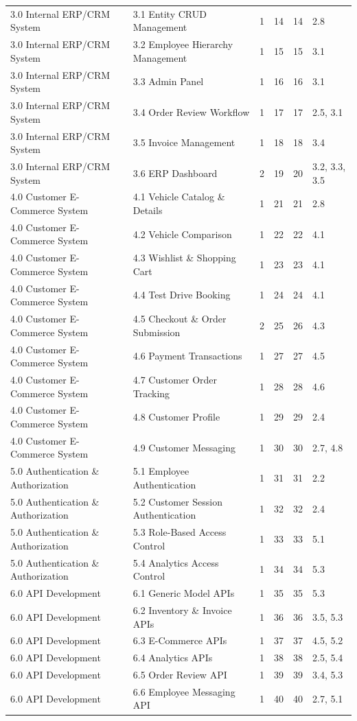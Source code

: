 \begin{longtable}{@{}p{3cm}p{5.5cm}rrrp{1.8cm}@{}}
3.0 Internal ERP/CRM System
& 3.1 Entity CRUD Management & 1 & 14 & 14 & 2.8 \\
3.0 Internal ERP/CRM System
& 3.2 Employee Hierarchy Management & 1 & 15 & 15 & 3.1 \\
3.0 Internal ERP/CRM System
& 3.3 Admin Panel & 1 & 16 & 16 & 3.1 \\
3.0 Internal ERP/CRM System
& 3.4 Order Review Workflow & 1 & 17 & 17 & 2.5, 3.1 \\
3.0 Internal ERP/CRM System
& 3.5 Invoice Management & 1 & 18 & 18 & 3.4 \\
3.0 Internal ERP/CRM System
& 3.6 ERP Dashboard & 2 & 19 & 20 & 3.2, 3.3, 3.5 \\

4.0 Customer E-Commerce System
& 4.1 Vehicle Catalog \& Details & 1 & 21 & 21 & 2.8 \\
4.0 Customer E-Commerce System
& 4.2 Vehicle Comparison & 1 & 22 & 22 & 4.1 \\
4.0 Customer E-Commerce System
& 4.3 Wishlist \& Shopping Cart & 1 & 23 & 23 & 4.1 \\
4.0 Customer E-Commerce System
& 4.4 Test Drive Booking & 1 & 24 & 24 & 4.1 \\
4.0 Customer E-Commerce System
& 4.5 Checkout \& Order Submission & 2 & 25 & 26 & 4.3 \\
4.0 Customer E-Commerce System
& 4.6 Payment Transactions & 1 & 27 & 27 & 4.5 \\
4.0 Customer E-Commerce System
& 4.7 Customer Order Tracking & 1 & 28 & 28 & 4.6 \\
4.0 Customer E-Commerce System
& 4.8 Customer Profile & 1 & 29 & 29 & 2.4 \\
4.0 Customer E-Commerce System
& 4.9 Customer Messaging & 1 & 30 & 30 & 2.7, 4.8 \\

5.0 Authentication \& Authorization
& 5.1 Employee Authentication & 1 & 31 & 31 & 2.2 \\
5.0 Authentication \& Authorization
& 5.2 Customer Session Authentication & 1 & 32 & 32 & 2.4 \\
5.0 Authentication \& Authorization
& 5.3 Role-Based Access Control & 1 & 33 & 33 & 5.1 \\
5.0 Authentication \& Authorization
& 5.4 Analytics Access Control & 1 & 34 & 34 & 5.3 \\

6.0 API Development
& 6.1 Generic Model APIs & 1 & 35 & 35 & 5.3 \\
6.0 API Development
& 6.2 Inventory \& Invoice APIs & 1 & 36 & 36 & 3.5, 5.3 \\
6.0 API Development
& 6.3 E-Commerce APIs & 1 & 37 & 37 & 4.5, 5.2 \\
6.0 API Development
& 6.4 Analytics APIs & 1 & 38 & 38 & 2.5, 5.4 \\
6.0 API Development
& 6.5 Order Review API & 1 & 39 & 39 & 3.4, 5.3 \\
6.0 API Development
& 6.6 Employee Messaging API & 1 & 40 & 40 & 2.7, 5.1 \\


\end{longtable}
